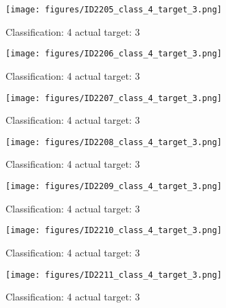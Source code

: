 \begin{figure}[h!]
\begin{center}
\texttt{[image: figures/ID2205\_class\_4\_target\_3.png]}
\end{center}
\caption{ Classification: 4 actual target: 3}
\label{fig:ID2205_class_4_target_3}
\end{figure}
\begin{figure}[h!]
\begin{center}
\texttt{[image: figures/ID2206\_class\_4\_target\_3.png]}
\end{center}
\caption{ Classification: 4 actual target: 3}
\label{fig:ID2206_class_4_target_3}
\end{figure}
\begin{figure}[h!]
\begin{center}
\texttt{[image: figures/ID2207\_class\_4\_target\_3.png]}
\end{center}
\caption{ Classification: 4 actual target: 3}
\label{fig:ID2207_class_4_target_3}
\end{figure}
\begin{figure}[h!]
\begin{center}
\texttt{[image: figures/ID2208\_class\_4\_target\_3.png]}
\end{center}
\caption{ Classification: 4 actual target: 3}
\label{fig:ID2208_class_4_target_3}
\end{figure}
\begin{figure}[h!]
\begin{center}
\texttt{[image: figures/ID2209\_class\_4\_target\_3.png]}
\end{center}
\caption{ Classification: 4 actual target: 3}
\label{fig:ID2209_class_4_target_3}
\end{figure}
\begin{figure}[h!]
\begin{center}
\texttt{[image: figures/ID2210\_class\_4\_target\_3.png]}
\end{center}
\caption{ Classification: 4 actual target: 3}
\label{fig:ID2210_class_4_target_3}
\end{figure}
\begin{figure}[h!]
\begin{center}
\texttt{[image: figures/ID2211\_class\_4\_target\_3.png]}
\end{center}
\caption{ Classification: 4 actual target: 3}
\label{fig:ID2211_class_4_target_3}
\end{figure}

